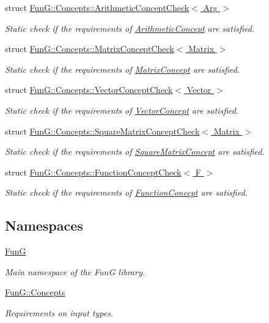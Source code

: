 \begin{DoxyCompactItemize}
struct \hyperlink{structFunG_1_1Concepts_1_1ArithmeticConceptCheck}{Fun\-G\-::\-Concepts\-::\-Arithmetic\-Concept\-Check$<$ Arg $>$}
\begin{DoxyCompactList}\small\item\em Static check if the requirements of \hyperlink{structFunG_1_1Concepts_1_1ArithmeticConcept}{Arithmetic\-Concept} are satisfied. \end{DoxyCompactList}\item 
struct \hyperlink{structFunG_1_1Concepts_1_1MatrixConceptCheck}{Fun\-G\-::\-Concepts\-::\-Matrix\-Concept\-Check$<$ Matrix $>$}
\begin{DoxyCompactList}\small\item\em Static check if the requirements of \hyperlink{structFunG_1_1Concepts_1_1MatrixConcept}{Matrix\-Concept} are satisfied. \end{DoxyCompactList}\item 
struct \hyperlink{structFunG_1_1Concepts_1_1VectorConceptCheck}{Fun\-G\-::\-Concepts\-::\-Vector\-Concept\-Check$<$ Vector $>$}
\begin{DoxyCompactList}\small\item\em Static check if the requirements of \hyperlink{structFunG_1_1Concepts_1_1VectorConcept}{Vector\-Concept} are satisfied. \end{DoxyCompactList}\item 
struct \hyperlink{structFunG_1_1Concepts_1_1SquareMatrixConceptCheck}{Fun\-G\-::\-Concepts\-::\-Square\-Matrix\-Concept\-Check$<$ Matrix $>$}
\begin{DoxyCompactList}\small\item\em Static check if the requirements of \hyperlink{structFunG_1_1Concepts_1_1SquareMatrixConcept}{Square\-Matrix\-Concept} are satisfied. \end{DoxyCompactList}\item 
struct \hyperlink{structFunG_1_1Concepts_1_1FunctionConceptCheck}{Fun\-G\-::\-Concepts\-::\-Function\-Concept\-Check$<$ F $>$}
\begin{DoxyCompactList}\small\item\em Static check if the requirements of \hyperlink{structFunG_1_1Concepts_1_1FunctionConcept}{Function\-Concept} are satisfied. \end{DoxyCompactList}\end{DoxyCompactItemize}
\subsection*{Namespaces}
\begin{DoxyCompactItemize}
\item 
\hyperlink{namespaceFunG}{Fun\-G}
\begin{DoxyCompactList}\small\item\em Main namespace of the Fun\-G library. \end{DoxyCompactList}\item 
\hyperlink{namespaceFunG_1_1Concepts}{Fun\-G\-::\-Concepts}
\begin{DoxyCompactList}\small\item\em Requirements on input types. \end{DoxyCompactList}\end{DoxyCompactItemize}

